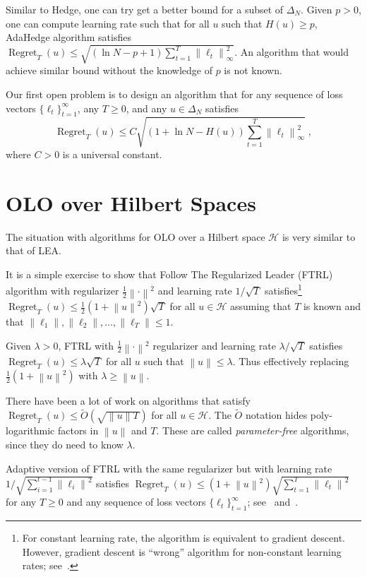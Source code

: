 \documentclass{colt2016} %
\DeclareMathOperator{\Regret}{Regret}
\renewcommand{\H}{\mathcal{H}}  %
\newcommand{\norm}[1]{\left\|{#1}\right\|}
\begin{document}
Similar to Hedge, one can try get a better bound for a subset of $\Delta_N$.
Given $p > 0$, one can compute learning rate such that for all $u$ such that
$H(u) \ge p$, AdaHedge algorithm satisfies $\Regret_T(u) \le \sqrt{(\ln N - p +
1) \sum_{t=1}^T \norm{\ell_t}_\infty^2}$. An algorithm that would achieve
similar bound without the knowledge of $p$ is not known.

Our first open problem is to design an algorithm that for any
sequence of loss vectors $\{\ell_t\}_{t=1}^\infty$, any $T \ge 0$,
and any $u \in \Delta_N$ satisfies
$$
\Regret_T(u) \le C \sqrt{(1 + \ln N - H(u)) \sum_{t=1}^T \norm{\ell_t}_\infty^2} \; ,
$$
where $C > 0$ is a universal constant.

\section{OLO over Hilbert Spaces}

The situation with algorithms for OLO over a Hilbert space $\H$ is very similar
to that of LEA.

It is a simple exercise to show that Follow The Regularized Leader (FTRL)
algorithm with regularizer $\frac{1}{2}\norm{\cdot}^2$ and learning rate
$1/\sqrt{T}$ satisfies\footnote{For constant learning rate, the algorithm is
equivalent to gradient descent. However, gradient descent is ``wrong'' algorithm
for non-constant learning rates; see~\cite{Orabona-Pal-2016-scale-free}.}
$\Regret_T(u) \le \frac{1}{2}(1 + \norm{u}^2) \sqrt{T}$ for all $u \in \H$
assuming that $T$ is known and that $\norm{\ell_1}, \norm{\ell_2}, \dots,
\norm{\ell_T} \le 1$.

Given $\lambda > 0$, FTRL with $\frac{1}{2}\norm{\cdot}^2$ regularizer and
learning rate $\lambda/\sqrt{T}$ satisfies $\Regret_T(u) \le \lambda \sqrt{T}$
for all $u$ such that $\norm{u} \le \lambda$. Thus effectively replacing
$\frac{1}{2}(1 + \norm{u}^2)$ with $\lambda \ge \norm{u}$.

There have been a lot of work \citep{Streeter-McMahan-2012, Orabona-2013,
McMahan-Abernethy-2013, McMahan-Orabona-2014} on algorithms that satisfy
$\Regret_T(u) \le \widetilde O(\sqrt{\norm{u} T})$ for all $u \in \H$.
The $\widetilde O$ notation hides poly-logarithmic factors in $\norm{u}$ and
$T$. These are called \emph{parameter-free} algorithms, since they do need to
know $\lambda$.

Adaptive version of FTRL with the same regularizer but with learning rate
$1/\sqrt{\sum_{i=1}^{t-1} \norm{\ell_i}^2}$ satisfies $\Regret_T(u) \le
(1+\norm{u}^2) \sqrt{\sum_{t=1}^T \norm{\ell_t}^2}$ for any $T \ge 0$ and any
sequence of loss vectors $\{\ell_t\}_{t=1}^\infty$; see~\cite{Orabona-Pal-2015}
and~\cite{Duchi-Hazan-Singer-2011}.
\end{document}

